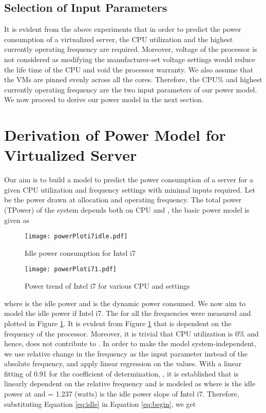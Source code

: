 \documentclass{sig-alternate}
\begin{document}
\subsection{Selection of Input Parameters}
It is evident from the above experiments that in order to predict the power consumption of a virtualized server, the CPU utilization and the highest currently operating frequency are required. Moreover, voltage of the processor is not considered as modifying the manufacturer-set voltage settings would reduce the life time of the CPU and void the processor warranty. We also assume that the VMs are pinned evenly across all the cores. Therefore, the CPU\% and highest currently operating frequency are the two input parameters of our power model. We now proceed to derive our power model in the next section. 
\section{Derivation of Power Model for Virtualized Server}
\label{sec:WModelDer}
Our aim is to build a model to predict the power consumption of a server for a given CPU utilization and frequency settings with minimal inputs required. Let  be the power drawn at  allocation and  operating frequency. The total power (TPower) of the system depends both on CPU and , the basic power model is given as 

\begin{figure}[!htbp]
\begin{center}
 \texttt{[image: powerPloti7idle.pdf]}
\caption{Idle power consumption for Intel i7}
\label{fig:powerPloti7idle}
\end{center}
\vspace{-0.5cm}
\end{figure}
\begin{figure}[!htbp]
\begin{center}
\vspace{-0.5cm	}
 \texttt{[image: powerPloti71.pdf]}
\caption{Power trend of Intel i7 for various CPU and  settings}
\label{fig:powerPloti7}
\end{center}
\vspace{-0.5cm}
\end{figure}
where  is the idle power and  is the dynamic power consumed. We now aim to model the idle power if Intel i7. The  for all the frequencies were measured and plotted in Figure \ref{fig:powerPloti7idle}. It is evident from Figure \ref{fig:powerPloti7idle} that  is dependent on the frequency of the processor. Moreover, it is trivial that CPU utilization is 0\% and hence, does not contribute to . In order to make the model system-independent, we use relative change in the frequency as the input parameter instead of the absolute frequency, and apply linear regression on the  values. With a linear fitting of 0.91 for the coefficient of determination, , it is established that  is linearly dependent on the relative frequency and is modeled as 
where  is the idle power at  and  = 1.237 (watts) is the idle power slope of Intel i7. Therefore, substituting Equation \ref{eq:idle} in Equation \ref{eq:begin}, we get 
\end{document}
